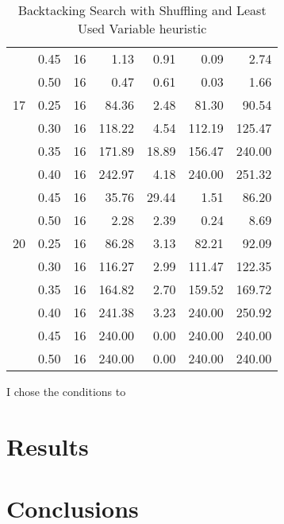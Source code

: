 \documentclass[11pt]{article}
\begin{document}
\begin{table}
\begin{tabular}{llrrrrr}
    & 0.45 &    16 &   1.13 &  0.91 &   0.09 &   2.74 \\
    & 0.50 &    16 &   0.47 &  0.61 &   0.03 &   1.66 \\
    \hline
    17 & 0.25 &    16 &  84.36 &  2.48 &  81.30 &  90.54 \\
    & 0.30 &    16 & 118.22 &  4.54 & 112.19 & 125.47 \\
    & 0.35 &    16 & 171.89 & 18.89 & 156.47 & 240.00 \\
    & 0.40 &    16 & 242.97 &  4.18 & 240.00 & 251.32 \\
    & 0.45 &    16 &  35.76 & 29.44 &   1.51 &  86.20 \\
    & 0.50 &    16 &   2.28 &  2.39 &   0.24 &   8.69 \\ 
    \hline
    20 & 0.25 &    16 &  86.28 &  3.13 &  82.21 &  92.09 \\
    & 0.30 &    16 & 116.27 &  2.99 & 111.47 & 122.35 \\
    & 0.35 &    16 & 164.82 &  2.70 & 159.52 & 169.72 \\
    & 0.40 &    16 & 241.38 &  3.23 & 240.00 & 250.92 \\
    & 0.45 &    16 & 240.00 &  0.00 & 240.00 & 240.00 \\
    & 0.50 &    16 & 240.00 &  0.00 & 240.00 & 240.00 \\
    \bottomrule
  \end{tabular}
  \caption{Backtacking Search with Shuffling and Least Used Variable
    heuristic}
\end{table}
\par
I chose the conditions to
\section{Results}
\section{Conclusions}
\end{document}
